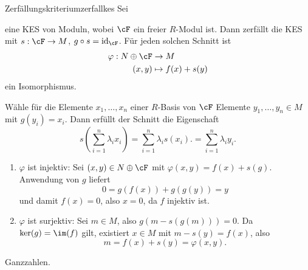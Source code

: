 \begin{satz}{Zerfällungskriterium}{zerfallkes}
Sei 
\begin{center}
\end{center}
eine KES von Moduln, wobei $\cF$ ein freier $R$-Modul ist. Dann zerfällt die KES mit $s: \cF \to M$, $g \circ s = \id_\cF$. Für jeden solchen Schnitt ist 
\begin{equation}
\begin{split}
\varphi: N \oplus \cF &\to M\\
(x,y) &\mapsto f(x) + s(y)
\end{split}
\end{equation}
ein Isomorphismus.
\end{satz}
\begin{beweis}
Wähle für die Elemente $x_1, \dots, x_n$ einer $R$-Basis von $\cF$ Elemente $y_1, \dots, y_n \in M$ mit $g(y_i)=x_i$. Dann erfüllt der Schnitt die Eigenschaft 
\begin{equation}
s\left( \sum_{i=1}^n \lambda_i x_i \right) = \sum_{i=1}^n \lambda_i s(x_i). = \sum_{i=1}^n \lambda_i y_i.
\end{equation}
\begin{enumerate}
\item $\varphi$ ist injektiv: Sei $(x,y)\in N \oplus \cF$ mit $\varphi(x,y) =f(x)+s(g)$. Anwendung von $g$ liefert
\begin{equation}
0 = g\left( f(x)\right) + g \left( g(y) \right) = y
\end{equation}
und damit $f(x)=0$, also $x=0$, da $f$ injektiv ist.
\item $\varphi$ ist surjektiv: Sei $m \in M$, also $g(m-s(g(m))) = 0$. Da $\ker (g) = \im (f)$ gilt, existiert $x \in M$ mit $m-s(y)=f(x)$, also
\begin{equation}
m = f(x)+s(y)=\varphi(x,y).
\end{equation}
\end{enumerate}
\end{beweis}
\begin{beispiel}Ganzzahlen.
\begin{center}
\end{center}
\end{beispiel}